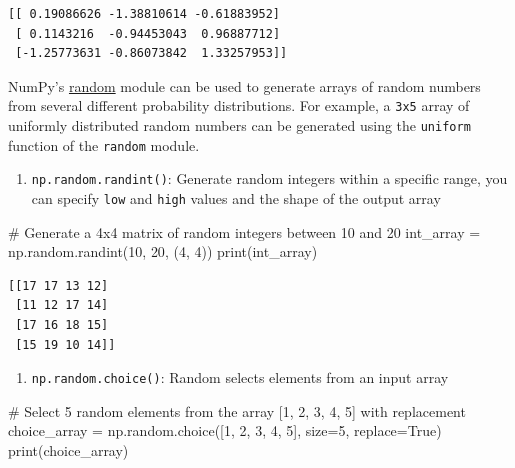 \documentclass[
  letterpaper,
  DIV=11,
  numbers=noendperiod]{scrreprt}
\newenvironment{Shaded}{\begin{snugshade}}{\end{snugshade}}
\newcommand{\BuiltInTok}[1]{\textcolor[rgb]{0.00,0.23,0.31}{#1}}
\newcommand{\CommentTok}[1]{\textcolor[rgb]{0.37,0.37,0.37}{#1}}
\newcommand{\DecValTok}[1]{\textcolor[rgb]{0.68,0.00,0.00}{#1}}
\newcommand{\NormalTok}[1]{\textcolor[rgb]{0.00,0.23,0.31}{#1}}
\newcommand{\OperatorTok}[1]{\textcolor[rgb]{0.37,0.37,0.37}{#1}}
\newcommand{\VariableTok}[1]{\textcolor[rgb]{0.07,0.07,0.07}{#1}}
\providecommand{\tightlist}{%
  \setlength{\itemsep}{0pt}\setlength{\parskip}{0pt}}\usepackage{longtable,booktabs,array}
\begin{document}
\begin{verbatim}
[[ 0.19086626 -1.38810614 -0.61883952]
 [ 0.1143216  -0.94453043  0.96887712]
 [-1.25773631 -0.86073842  1.33257953]]
\end{verbatim}

NumPy's
\href{https://numpy.org/doc/stable/reference/random/index.html}{random}
module can be used to generate arrays of random numbers from several
different probability distributions. For example, a \texttt{3x5} array
of uniformly distributed random numbers can be generated using the
\texttt{uniform} function of the \texttt{random} module.

\begin{enumerate}
\def\labelenumi{\arabic{enumi}.}
\setcounter{enumi}{2}
\tightlist
\item
  \texttt{np.random.randint()}: Generate random integers within a
  specific range, you can specify \texttt{low} and \texttt{high} values
  and the shape of the output array
\end{enumerate}

\begin{Shaded}
\begin{Highlighting}[]
\CommentTok{\# Generate a 4x4 matrix of random integers between 10 and 20}
\NormalTok{int\_array }\OperatorTok{=}\NormalTok{ np.random.randint(}\DecValTok{10}\NormalTok{, }\DecValTok{20}\NormalTok{, (}\DecValTok{4}\NormalTok{, }\DecValTok{4}\NormalTok{))}
\BuiltInTok{print}\NormalTok{(int\_array)}
\end{Highlighting}
\end{Shaded}

\begin{verbatim}
[[17 17 13 12]
 [11 12 17 14]
 [17 16 18 15]
 [15 19 10 14]]
\end{verbatim}

\begin{enumerate}
\def\labelenumi{\arabic{enumi}.}
\setcounter{enumi}{3}
\tightlist
\item
  \texttt{np.random.choice()}: Random selects elements from an input
  array
\end{enumerate}

\begin{Shaded}
\begin{Highlighting}[]
\CommentTok{\# Select 5 random elements from the array [1, 2, 3, 4, 5] with replacement}
\NormalTok{choice\_array }\OperatorTok{=}\NormalTok{ np.random.choice([}\DecValTok{1}\NormalTok{, }\DecValTok{2}\NormalTok{, }\DecValTok{3}\NormalTok{, }\DecValTok{4}\NormalTok{, }\DecValTok{5}\NormalTok{], size}\OperatorTok{=}\DecValTok{5}\NormalTok{, replace}\OperatorTok{=}\VariableTok{True}\NormalTok{)}
\BuiltInTok{print}\NormalTok{(choice\_array)}
\end{Highlighting}
\end{Shaded}
\end{document}
